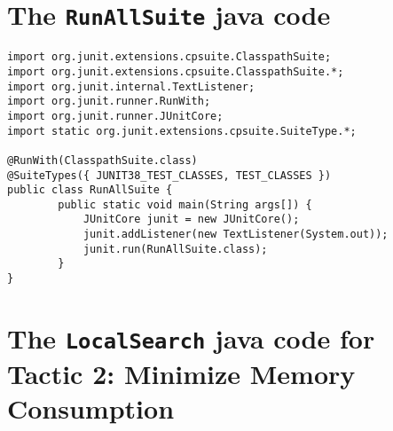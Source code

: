 
\section{The \texttt{RunAllSuite} java code}\label{sec:alltests}

\begin{lstlisting}
import org.junit.extensions.cpsuite.ClasspathSuite;
import org.junit.extensions.cpsuite.ClasspathSuite.*;
import org.junit.internal.TextListener;
import org.junit.runner.RunWith;
import org.junit.runner.JUnitCore;
import static org.junit.extensions.cpsuite.SuiteType.*;

@RunWith(ClasspathSuite.class)
@SuiteTypes({ JUNIT38_TEST_CLASSES, TEST_CLASSES })
public class RunAllSuite {
        public static void main(String args[]) {
        	JUnitCore junit = new JUnitCore();
            junit.addListener(new TextListener(System.out));
            junit.run(RunAllSuite.class);
        }
}
\end{lstlisting}

\section{The \texttt{LocalSearch} java code for Tactic 2: Minimize Memory Consumption}\label{sec:LocalSearch_Memory}

